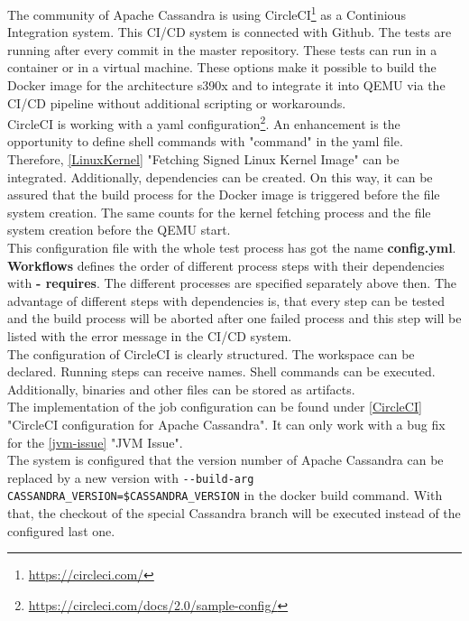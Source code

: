 The community of Apache Cassandra is using CircleCI\footnote{\url{https://circleci.com/}} as a Continious Integration system.
This \gls{CI/CD} system is connected with Github. The tests are running after every commit in the master repository.
These tests can run in a container or in a virtual machine. These options make it possible to build the Docker image for the architecture s390x and to integrate it into \gls{QEMU} via the \gls{CI/CD} pipeline without additional scripting or workarounds. \\
CircleCI is working with a yaml configuration\footnote{\url{https://circleci.com/docs/2.0/sample-config/}}. 
An enhancement is the opportunity to define shell commands with "command" in the yaml file. Therefore, \ref{LinuxKernel} "Fetching Signed Linux Kernel Image" can be integrated. 
Additionally, dependencies can be created. On this way, it can be assured that the build process for the Docker image is triggered before the file system creation. 
The same counts for the kernel fetching process and the file system creation before the \gls{QEMU} start. \\
This configuration file with the whole test process has got the name \textbf{config.yml}. \\
\textbf{Workflows} defines the order of different process steps with their dependencies with \textbf{- requires}.
The different processes are specified separately above then. 
The advantage of different steps with dependencies is, that every step can be tested and the build process will be aborted after one failed process and this step will be listed with the error message in the \gls{CI/CD} system. \\
The configuration of CircleCI is clearly structured. The workspace can be declared. Running steps can receive names. Shell commands can be executed. Additionally, binaries and other files can be stored as artifacts. \\
The implementation of the job configuration can be found under \ref{CircleCI} "CircleCI configuration for Apache Cassandra". It can only work with a bug fix for the \ref{jvm-issue} "JVM Issue".\\
The system is configured that the version number of Apache Cassandra can be replaced by a new version with \verb+--build-arg CASSANDRA_VERSION=$CASSANDRA_VERSION+ in the docker build command. With that, the checkout of the special Cassandra branch will be executed instead of the configured last one.

